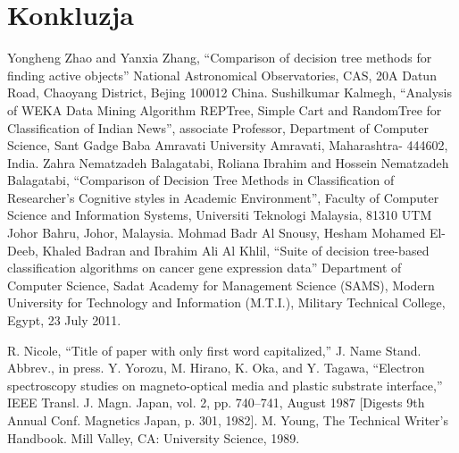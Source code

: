 \documentclass[conference]{IEEEtran}
\begin{document}
\section{Konkluzja}

\begin{thebibliography}{00}
 Yongheng Zhao and Yanxia Zhang, ``Comparison of decision tree methods for finding active objects'' National Astronomical Observatories, CAS, 20A Datun Road, Chaoyang District, Bejing 100012 China.
 Sushilkumar Kalmegh, ``Analysis of WEKA Data Mining Algorithm REPTree, Simple Cart and RandomTree for Classification of Indian News'', associate Professor, Department of Computer Science, Sant Gadge Baba Amravati University
Amravati, Maharashtra- 444602, India.
 Zahra Nematzadeh Balagatabi, Roliana Ibrahim and Hossein Nematzadeh Balagatabi, ``Comparison of Decision Tree Methods in Classification of Researcher’s Cognitive styles in Academic Environment'', Faculty of Computer Science and Information Systems, Universiti Teknologi Malaysia, 81310 UTM Johor Bahru, Johor, Malaysia.
 Mohmad Badr Al Snousy, Hesham Mohamed El-Deeb, Khaled Badran and Ibrahim Ali Al Khlil, ``Suite of decision tree-based classification algorithms on cancer gene expression data'' Department of Computer Science, Sadat Academy for Management Science (SAMS), Modern University for Technology and Information (M.T.I.),  Military Technical College, Egypt, 23 July 2011.

 R. Nicole, ``Title of paper with only first word capitalized,'' J. Name Stand. Abbrev., in press.
 Y. Yorozu, M. Hirano, K. Oka, and Y. Tagawa, ``Electron spectroscopy studies on magneto-optical media and plastic substrate interface,'' IEEE Transl. J. Magn. Japan, vol. 2, pp. 740--741, August 1987 [Digests 9th Annual Conf. Magnetics Japan, p. 301, 1982].
 M. Young, The Technical Writer's Handbook. Mill Valley, CA: University Science, 1989.
\end{thebibliography}
\end{document}
